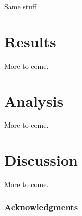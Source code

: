 \documentclass{article}
\begin{document}
Same stuff

\section{Results}

More to come.

\section{Analysis}

More to come.

\section{Discussion}

More to come.

\subsubsection*{Acknowledgments}


\end{document}
